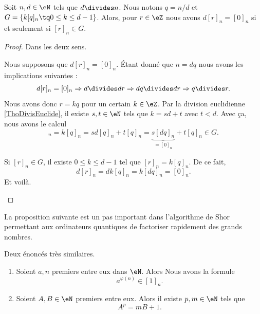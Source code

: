 \begin{lemma}		\label{LEMooRGIYooRxgyCO}
	Soit \( n,d\in \eN\) tels que \( d\divides n\). Nous notons \( q=n/d\) et \( G=\{ k[q]_n\tq 0\leq k\leq d-1 \}\). Alors, pour \( r\in \eZ\) nous avons \( d[r]_n=[0]_n\) si et seulement si \( [r]_n\in G\).
\end{lemma}

\begin{proof}
	Dans les deux sens.
	\begin{subproof}
		\spitem[\( \Rightarrow\)]
		Nous supposons que \( d[r]_n=[0]_n\). Étant donné que \( n=dq\) nous avons les implications suivantes :
		\begin{equation}
			d[r]_n=[0]_n\Rightarrow d\divides dr\Rightarrow dq\divides dr\Rightarrow q\divides r.
		\end{equation}
		Nous avons donc \( r=kq\) pour un certain \( k\in \eZ\). Par la division euclidienne \ref{ThoDivisEuclide}, il existe \( s,t\in \eN\) tels que \( k=sd+t\) avec \( t<d\). Avec ça, nous avons le calcul
		\begin{equation}
			[r]_n=k[q]_n=sd[q]_n+t[q]_n=\underbrace{s[dq]_n}_{=[0]_n}+t[q]_n\in G.
		\end{equation}

		\spitem[$\Leftarrow$]
		Si \( [r]_n\in G\), il existe \( 0\leq k\leq d-1\) tel que \( [r]_n=k[q]_n\). De ce fait,
		\begin{equation}
			d[r]_n=dk[q]_n=k[dq]_n=[0]_n.
		\end{equation}
		Et voilà.
	\end{subproof}
\end{proof}

La proposition suivante est un pas important dans l'algorithme de Shor permettant aux ordinateurs quantiques de factoriser rapidement des grands nombres\cite{BIBooBBRQooJxksHX}.

\begin{theorem}		\label{THOooXMBSooXrrfOP}
	Deux énoncés très similaires.
	\begin{enumerate}
		\item
		      Soient \( a,n\) premiers entre eux dans \( \eN\). Alors
		      Nous avons la formule
		      \begin{equation}
			      a^{\varphi(n)}\in [1]_n.
		      \end{equation}
		\item		\label{ITEMooJHZBooXVKMlT}
		      Soient \( A,B\in \eN\) premiers entre eux. Alors il existe \( p,m\in \eN\) tels que
		      \begin{equation}
			      A^p=mB+1.
		      \end{equation}
	\end{enumerate}
\end{theorem}

